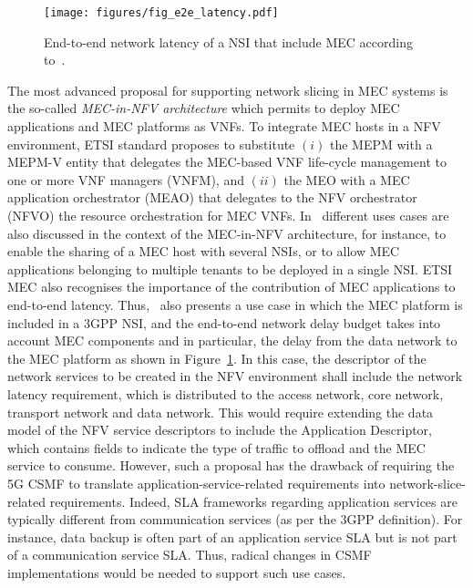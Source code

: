 %
\begin{figure}[htbp]
\centering
\texttt{[image: figures/fig\_e2e\_latency.pdf]}
\caption{End-to-end network latency of a NSI that include MEC according to~\cite{MEC024}.}
\label{fig:e2e_latency}
\vspace{-0.2cm}
\end{figure}
%
The most advanced proposal for supporting network slicing in MEC systems is the so-called \emph{MEC-in-NFV architecture} which permits to deploy MEC applications and MEC platforms as VNFs. To integrate MEC hosts in a NFV environment, ETSI standard proposes to substitute $(i)$ the MEPM with a MEPM-V entity that delegates the MEC-based VNF life-cycle management to one or more VNF managers (VNFM), and $(ii)$ the MEO with a MEC application orchestrator (MEAO) that delegates to the NFV orchestrator (NFVO) the resource orchestration for MEC VNFs. In~\cite{MEC024} different uses cases are also discussed in the context of the MEC-in-NFV architecture, for instance, to enable the sharing of a MEC host with several NSIs, or to allow MEC applications belonging to multiple tenants to be deployed in a single NSI. ETSI MEC also recognises the importance of the contribution of MEC applications to end-to-end latency. Thus,~\cite{MEC024} also presents a use case in which the MEC platform is included in a 3GPP NSI, and the end-to-end network delay budget takes into account MEC components and in particular, the delay from the data network to the MEC platform as shown in Figure~\ref{fig:e2e_latency}. In this case, the descriptor of the network services to be created in the NFV environment shall include the network latency requirement, which is distributed to the access network, core network, transport network and data network. This would require extending the data model of the NFV service descriptors to include the Application Descriptor, which contains fields to indicate the type of traffic to offload and the MEC service to consume. However, such a proposal has the drawback of requiring the 5G CSMF to translate application-service-related requirements into network-slice-related requirements. Indeed, SLA frameworks regarding application services are typically different from communication services (as per the 3GPP definition). For instance, data backup is often part of an application service SLA but is not part of a communication service SLA. Thus, radical changes in CSMF implementations would be needed to support such use cases.

